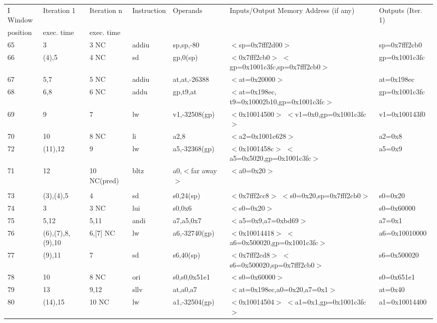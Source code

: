 \documentclass[10pt,dvips]{article}
\begin{document}
\begin{landscape}
\begin{table}
\begin{tabular}{lllllll}
I Window & Iteration 1 & Iteration n & Instruction & Operands & \multicolumn{1}{l}{Inputs/Output Memory Address (if any)}
	& Outputs (Iter. 1) \\
position & exec. time  & exec. time  &             &          &
        &     \\   
\hline  
65 & 3	   & 3 NC &	addiu	& sp,sp,-80	& $<$sp=0x7fff2d00$>$	&				sp=0x7fff2cb0\\
66 & (4),5 & 4 NC &	sd	& gp,0(sp) 	& $<$0x7fff2cb0$>$	$<$gp=0x1001c3fc,sp=0x7fff2cb0$>$ &	gp=0x1001c3fc\\
67 & 5,7   & 5 NC &	addiu	& at,at,-26388	& $<$at=0x20000$>$				&	at=0x198ec\\
68 & 6,8   & 6 NC &	addu	& gp,t9,at	& $<$at=0x198ec,	t9=0x10002b10,gp=0x1001c3fc$>$ &	gp=0x1001c3fc\\
69 & 9     & 7    &	lw	& v1,-32508(gp) & $<$0x10014500$>$	$<$v1=0x0,gp=0x1001c3fc$>$	&	v1=0x100143f0\\
70 & 10	   & 8 NC &	li	& a2,8		& $<$a2=0x1001c628$>$				&	a2=0x8\\
72 & (11),12 & 9  &	lw	& a5,-32368(gp) & $<$0x1001458c$>$	$<$a5=0x5020,gp=0x1001c3fc$>$ &	a5=0x9\\
71 & 12    & 10 NC(pred) &	bltz	& a0,$<$far away$>$	& $<$a0=0x20$>$ & \\
& & & & & & \\
73 & (3),(4),5 & 4    &	sd	& s0,24(sp) 	& $<$0x7fff2cc8$>$	$<$s0=0x20,sp=0x7fff2cb0$>$	&	s0=0x20\\
74 & 3         & 3 NC &	lui	& s0,0x6	& $<$s0=0x20$>$				&	s0=0x60000\\
75 & 5,12      & 5,11 &	andi	& a7,a5,0x7	& $<$a5=0x9,a7=0xbd69$>$			&	a7=0x1\\
76 & (6),(7),8,(9),10 & 6,[7] NC &	lw	& a6,-32740(gp) & $<$0x10014418$>$	$<$a6=0x500020,gp=0x1001c3fc$>$ &	a6=0x10010000\\
77 & (9),11    & 7    &	sd	& s6,40(sp) 	& $<$0x7fff2cd8$>$	$<$s6=0x500020,sp=0x7fff2cb0$>$ &	s6=0x500020\\
78 & 10        & 8 NC &	ori	& s0,s0,0x51e1	& $<$s0=0x60000$>$				&	s0=0x651e1\\
79 & 13        & 9,12 &	sllv	& at,a0,a7	& $<$at=0x198ec,a0=0x20,a7=0x1$>$		&	at=0x40\\
80 & (14),15   & 10 NC &	lw	& a1,-32504(gp) & $<$0x10014504$>$	$<$a1=0x1,gp=0x1001c3fc$>$	&	a1=0x10014400\\
\end{tabular}


\end{table}
\end{landscape}
\end{document}
